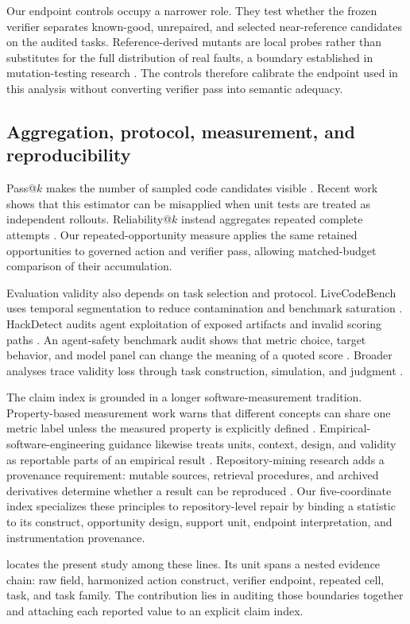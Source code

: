 Our endpoint controls occupy a narrower role. They test whether the frozen verifier separates known-good, unrepaired, and selected near-reference candidates on the audited tasks. Reference-derived mutants are local probes rather than substitutes for the full distribution of real faults, a boundary established in mutation-testing research \citep{just2014mutants}. The controls therefore calibrate the endpoint used in this analysis without converting verifier pass into semantic adequacy.

\subsection{Aggregation, protocol, measurement, and reproducibility}

Pass@$k$ makes the number of sampled code candidates visible \citep{chen2021codex}. Recent work shows that this estimator can be misapplied when unit tests are treated as independent rollouts. Reliability@$k$ instead aggregates repeated complete attempts \citep{jiang2026beyond}. Our repeated-opportunity measure applies the same retained opportunities to governed action and verifier pass, allowing matched-budget comparison of their accumulation.

Evaluation validity also depends on task selection and protocol. LiveCodeBench uses temporal segmentation to reduce contamination and benchmark saturation \citep{jain2025livecodebench}. HackDetect audits agent exploitation of exposed artifacts and invalid scoring paths \citep{shao2026protocol}. An agent-safety benchmark audit shows that metric choice, target behavior, and model panel can change the meaning of a quoted score \citep{wang2026safetyaudit}. Broader analyses trace validity loss through task construction, simulation, and judgment \citep{caban2026measurement}.

The claim index is grounded in a longer software-measurement tradition. Property-based measurement work warns that different concepts can share one metric label unless the measured property is explicitly defined \citep{briand1996measurement}. Empirical-software-engineering guidance likewise treats units, context, design, and validity as reportable parts of an empirical result \citep{kitchenham2002guidelines,wohlin2012experimentation,ralph2018construct,sjoberg2023construct,ralph2020empiricalstandards}. Repository-mining research adds a provenance requirement: mutable sources, retrieval procedures, and archived derivatives determine whether a result can be reproduced \citep{gonzalez2012reproducibility}. Our five-coordinate index specializes these principles to repository-level repair by binding a statistic to its construct, opportunity design, support unit, endpoint interpretation, and instrumentation provenance.



 locates the present study among these lines. Its unit spans a nested evidence chain: raw field, harmonized action construct, verifier endpoint, repeated cell, task, and task family. The contribution lies in auditing those boundaries together and attaching each reported value to an explicit claim index.
